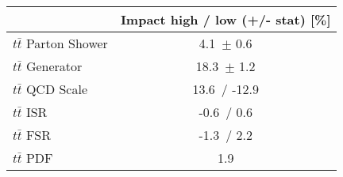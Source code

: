 \begin{tabular}{| l || c  |}
\hline
 & Impact high / low (+/- stat) [\%] \tabularnewline
\hline
$t\bar{t}$ Parton Shower & 4.1\, $\pm$  0.6  \tabularnewline
$t\bar{t}$ Generator & 18.3\, $\pm$  1.2 \tabularnewline
$t\bar{t}$ QCD Scale & 13.6\, / -12.9 \tabularnewline
$t\bar{t}$ ISR & -0.6\, / 0.6 \tabularnewline
$t\bar{t}$ FSR & -1.3\, / 2.2 \tabularnewline
$t\bar{t}$ PDF & 1.9 \tabularnewline
\hline
\end{tabular}
